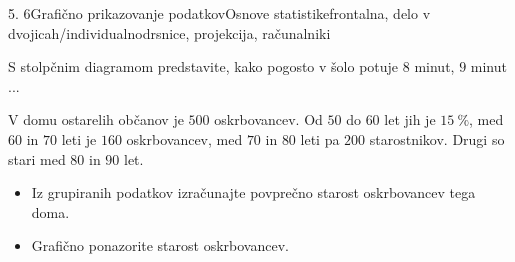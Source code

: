 \begin{priprava}{5. 6}{}{Grafično prikazovanje podatkov}{Osnove statistike}{frontalna, delo v dvojicah/individualno}{drsnice, projekcija, računalniki}
\begin{naloga}
     S stolpčnim diagramom predstavite, kako pogosto v šolo potuje $8$ minut, $9$ minut ... 

\end{naloga}

\begin{naloga}
 
    V domu ostarelih občanov je $500$ oskrbovancev. Od $50$ do $60$ let jih je $15~\%$, med $60$ in $70$ leti je $160$ oskrbovancev,
    med $70$ in $80$ leti pa $200$ starostnikov. Drugi so stari med $80$ in $90$ let.
    \begin{itemize}
        \item Iz grupiranih podatkov izračunajte povprečno starost oskrbovancev tega doma.
        \item Grafično ponazorite starost oskrbovancev.
    \end{itemize}
    
\end{naloga}




\end{priprava}